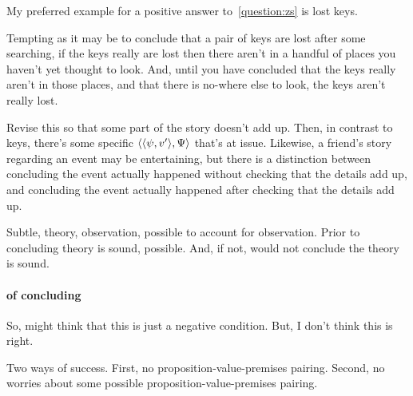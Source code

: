 \begin{note}
  My preferred example for a positive answer to~\ref{question:zs} is lost keys.

  \begin{illustration}
    Tempting as it may be to conclude that a pair of keys are lost after some searching, if the keys really are lost then there aren't in a handful of places you haven't yet thought to look. And, until you have concluded that the keys really aren't in those places, and that there is no-where else to look, the keys aren't really lost.
  \end{illustration}

  \begin{illustration}[Anecdotes]
    {
      \color{red}
      Revise this so that some part of the story doesn't add up.
      Then, in contrast to keys, there's some specific \(\langle \langle \psi, v' \rangle, \Psi \rangle\) that's at issue.
    }
    Likewise, a friend's story regarding an event may be entertaining, but there is a distinction between concluding the event actually happened without checking that the details add up, and concluding the event actually happened after checking that the details add up.
  \end{illustration}

  Subtle, theory, observation, possible to account for observation.
  Prior to concluding theory is sound, possible.
  And, if not, would not conclude the theory is sound.
\end{note}

\paragraph{ of concluding}

\begin{note}
  \color{red}
  So, might think that this is just a negative condition.
  But, I don't think this is right.

  Two ways of success.
  First, no proposition-value-premises pairing.
  Second, no worries about some possible proposition-value-premises pairing.
\end{note}

